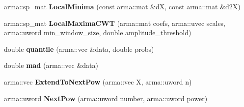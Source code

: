 \begin{DoxyCompactItemize}
\item 
\hypertarget{namespace_vespucci_1_1_math_a8d9d570bd9573eed29637015ea97a70f}{arma\+::sp\+\_\+mat {\bfseries Local\+Minima} (const arma\+::mat \&d\+X, const arma\+::mat \&d2\+X)}\label{namespace_vespucci_1_1_math_a8d9d570bd9573eed29637015ea97a70f}

\item 
\hypertarget{namespace_vespucci_1_1_math_a4c8faf974f4645faf1ab8d7e481e942e}{arma\+::sp\+\_\+mat {\bfseries Local\+Maxima\+C\+W\+T} (arma\+::mat coefs, arma\+::uvec scales, arma\+::uword min\+\_\+window\+\_\+size, double amplitude\+\_\+threshold)}\label{namespace_vespucci_1_1_math_a4c8faf974f4645faf1ab8d7e481e942e}

\item 
\hypertarget{namespace_vespucci_1_1_math_ae68dc0148a7d71a4d8fc32d5bb529fe2}{double {\bfseries quantile} (arma\+::vec \&data, double probs)}\label{namespace_vespucci_1_1_math_ae68dc0148a7d71a4d8fc32d5bb529fe2}

\item 
\hypertarget{namespace_vespucci_1_1_math_a969400e80b9f6bd1adf47db14cf4e38b}{double {\bfseries mad} (arma\+::vec \&data)}\label{namespace_vespucci_1_1_math_a969400e80b9f6bd1adf47db14cf4e38b}

\item 
\hypertarget{namespace_vespucci_1_1_math_aadc2b81e01a65a5de688088ca41791ce}{arma\+::vec {\bfseries Extend\+To\+Next\+Pow} (arma\+::vec X, arma\+::uword n)}\label{namespace_vespucci_1_1_math_aadc2b81e01a65a5de688088ca41791ce}

\item 
\hypertarget{namespace_vespucci_1_1_math_a979122c285b76d99e1cc430f8cd2fcd6}{arma\+::uword {\bfseries Next\+Pow} (arma\+::uword number, arma\+::uword power)}\label{namespace_vespucci_1_1_math_a979122c285b76d99e1cc430f8cd2fcd6}


\end{DoxyCompactItemize}
